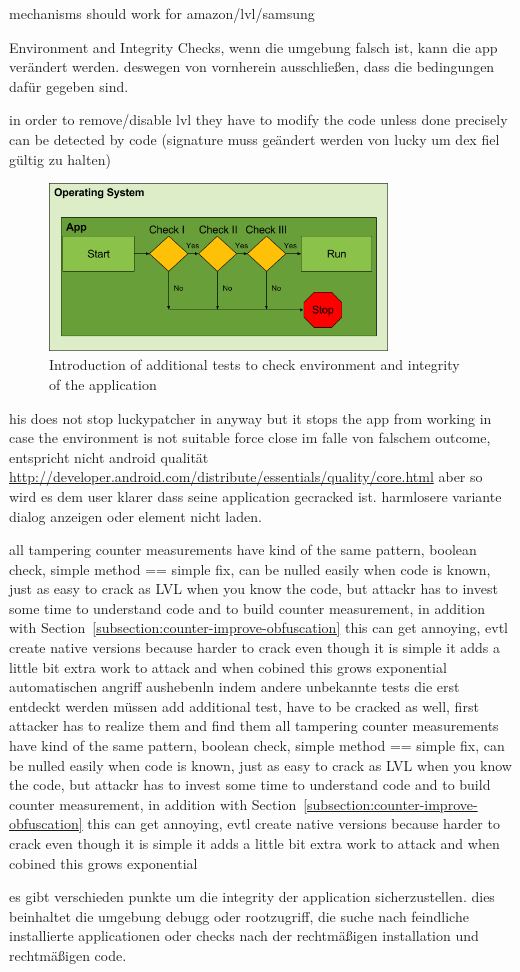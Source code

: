 mechanisms should work for amazon/lvl/samsung


Environment and Integrity Checks, wenn die umgebung falsch ist, kann die app verändert werden. deswegen von vornherein ausschließen, dass die bedingungen dafür gegeben sind.\cite{munteanLicense}

in order to remove/disable lvl they have to modify the code
unless done precisely can be detected by code (signature muss geändert werden von lucky um dex fiel gültig zu halten)\cite{developersSecuring}

\begin{figure}[h]
    \centering
    \includegraphics[width=0.8\textwidth]{data/verificationNowAdditional.png}
    \caption{Introduction of additional tests to check environment and integrity of the application}
    \label{fig:verificationNowAdditional}
\end{figure}
his does not stop luckypatcher in anyway but it stops the app from working in case the environment is not suitable
force close im falle von falschem outcome, entspricht nicht android qualität
\url{http://developer.android.com/distribute/essentials/quality/core.html} aber so wird es dem user klarer dass seine application gecracked ist. harmlosere variante dialog anzeigen oder element nicht laden.

all tampering counter measurements have kind of the same pattern, boolean check, simple method == simple fix, can be nulled easily when code is known, just as easy to crack as LVL when you know the code, but attackr has to invest some time to understand code and to build counter measurement, in addition with Section~\ref{subsection:counter-improve-obfuscation} this can get annoying, evtl create native versions because harder to crack
even though it is simple it adds a little bit extra work to attack and when cobined this grows exponential
automatischen angriff aushebenln indem andere unbekannte tests die erst entdeckt werden müssen
add additional test, have to be cracked as well, first attacker has to realize them and find them
all tampering counter measurements have kind of the same pattern, boolean check, simple method == simple fix, can be nulled easily when code is known, just as easy to crack as LVL when you know the code, but attackr has to invest some time to understand code and to build counter measurement, in addition with Section~\ref{subsection:counter-improve-obfuscation} this can get annoying, evtl create native versions because harder to crack
even though it is simple it adds a little bit extra work to attack and when cobined this grows exponential

es gibt verschieden punkte um die integrity der application sicherzustellen. dies beinhaltet die umgebung debugg oder rootzugriff, die suche nach feindliche installierte applicationen oder checks nach der rechtmäßigen installation und rechtmäßigen code.
